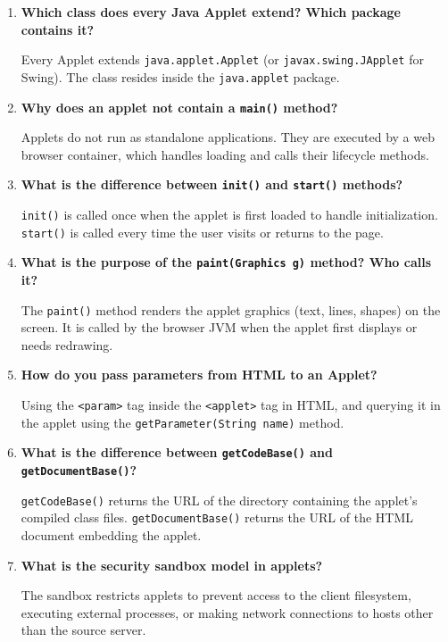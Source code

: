 \documentclass[12pt,a4paper]{article}
\newcommand{\Q}[1]{\textbf{#1}\par\noindent\ignorespaces}
\begin{document}
\begin{tcolorbox}[exambox, title={\textbf{Frequently Asked / Viva Questions}}]
\begin{enumerate}[leftmargin=*, label=\textbf{Q\arabic*.}, itemsep=5pt]
  \item \Q{Which class does every Java Applet extend? Which package contains it?}
        Every Applet extends \texttt{java.applet.Applet} (or \texttt{javax.swing.JApplet} for Swing). The class resides inside the \texttt{java.applet} package.
        
  \item \Q{Why does an applet not contain a \texttt{main()} method?}
        Applets do not run as standalone applications. They are executed by a web browser container, which handles loading and calls their lifecycle methods.
        
  \item \Q{What is the difference between \texttt{init()} and \texttt{start()} methods?}
        \texttt{init()} is called once when the applet is first loaded to handle initialization. \texttt{start()} is called every time the user visits or returns to the page.
        
  \item \Q{What is the purpose of the \texttt{paint(Graphics g)} method? Who calls it?}
        The \texttt{paint()} method renders the applet graphics (text, lines, shapes) on the screen. It is called by the browser JVM when the applet first displays or needs redrawing.
        
  \item \Q{How do you pass parameters from HTML to an Applet?}
        Using the \texttt{<param>} tag inside the \texttt{<applet>} tag in HTML, and querying it in the applet using the \texttt{getParameter(String name)} method.
        
  \item \Q{What is the difference between \texttt{getCodeBase()} and \texttt{getDocumentBase()}?}
        \texttt{getCodeBase()} returns the URL of the directory containing the applet's compiled class files. \texttt{getDocumentBase()} returns the URL of the HTML document embedding the applet.
        
  \item \Q{What is the security sandbox model in applets?}
        The sandbox restricts applets to prevent access to the client filesystem, executing external processes, or making network connections to hosts other than the source server.
        

\end{enumerate}
\end{tcolorbox}
\end{document}

